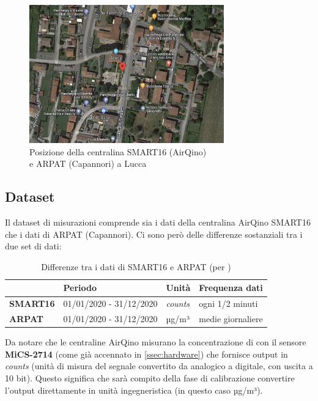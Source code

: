 \begin{figure}[H]
\centering
\captionsetup{justification=centering}
\includegraphics[width=0.75\textwidth,height=\textheight,keepaspectratio]{img/capannori_gps.png}
\caption{Posizione della centralina SMART16 (AirQino)\\e ARPAT (Capannori) a Lucca}
\label{fig:capannori-gps}
\end{figure}
\clearpage

\subsection{Dataset }\label{ssec:dataset-no2}
Il dataset di misurazioni  comprende sia i dati della centralina AirQino SMART16 che i dati di ARPAT (Capannori). Ci sono però delle differenze sostanziali tra i due set di dati:\\

\begin{table}[H]
\centering
\def\arraystretch{0.9}
\begin{tabular}{|l|l|l|l|}
\cline{2-4}
\multicolumn{1}{c|}{} & \textbf{Periodo} & \textbf{Unità} & \textbf{Frequenza dati} \\ \hline
\textbf{SMART16} & 01/01/2020 - 31/12/2020 & \textit{counts} & ogni 1/2 minuti \\ \hline
\textbf{ARPAT} & 01/01/2020 - 31/12/2020 & µg/m³ & medie giornaliere \\ \hline
\end{tabular}
\caption{Differenze tra i dati di SMART16 e ARPAT (per )}
\label{tab:dataset-no2-tabella}
\end{table}

Da notare che le centraline AirQino misurano la concentrazione di  con il sensore \textbf{MiCS-2714} (come già accennato in \ref{ssec:hardware}) che fornisce output in \textit{counts} (unità di misura del segnale convertito da analogico a digitale, con uscita a 10 bit). Questo significa che sarà compito della fase di calibrazione convertire l'output direttamente in unità ingegneristica (in questo caso µg/m³).\\

